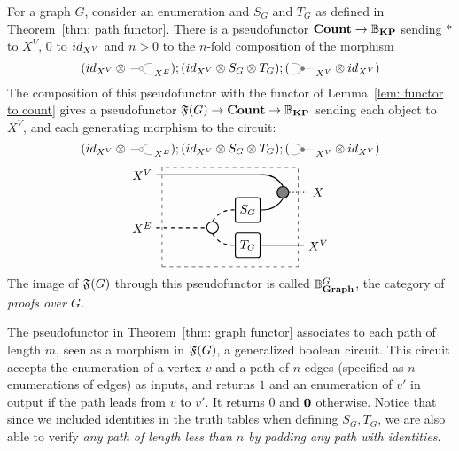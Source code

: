 \documentclass[submission,copyright,creativecommons,sharealike,noncommercial]{eptcs}
\begin{document}
\begin{theorem}\label{thm: graph functor}
  For a graph $G$, consider an enumeration and $S_G$ and $T_G$ 
  as defined in Theorem~\ref{thm: path functor}. There is a pseudofunctor 
  $\textbf{Count} \to \mathbb{B}_\textbf{KP}$ sending $*$ to $X^V$, $0$ to $id_{X^V}$ 
  and $n > 0$ to the $n$-fold composition of the morphism
  \begin{equation*}
      (\Id{X^V} \Tensor \COPYSym_{X^E});
      (\Id{X^V} \Tensor S_G \Tensor T_G);(\MATCHSym_{X^V} \Tensor \Id{X^V})
  \end{equation*}
  The composition of this pseudofunctor with the functor of 
  Lemma~\ref{lem: functor to count} gives a pseudofunctor 
  $\mathfrak{F}(G) \to \textbf{Count} \to \mathbb{B}_\textbf{KP}$ sending each object to $X^V$, and each 
  generating morphism to the circuit:
  \begin{equation*}
    (\Id{X^V} \Tensor \COPYSym_{X^E});
      (\Id{X^V} \Tensor S_G \Tensor T_G);(\MATCHSym_{X^V} \Tensor \Id{X^V})
  \end{equation*}
  \begin{equation*}
    \begin{tikzpicture}
      \node[draw, circle, radius=5pt, thick] (copy) at (-1,0.5) {};
      \node[draw, minimum height=20, minimum width=20, rounded corners=2, thick] (S) at (0,1) {$S_G$};
      \node[draw, minimum height=20, minimum width=20, rounded corners=2, thick] (T) at (0,0) {$T_G$};
      \node[draw, fill=gray, circle, radius=5pt, thick] (mat) at (1,1.5) {};

      \node[draw, dashed, minimum height=80, minimum width=110] (contour) at (-0.5,0.8) {};

      \node (Xv) at (-3,2) {$X^V$};
      \node (Xe) at (-3,0.5) {$X^E$};
      \node (X) at (2,1.5) {$X$};
      \node (Xv2) at (2,0) {$X^V$};

      \draw[-, thick] (Xv) to (10pt,2);
      \draw[bend left, thick] (10pt,2) to (mat.north);
      \draw[bend right, thick] (S.east) to (mat.south);

      \draw[dashed, -, thick] (Xe) to (copy.west);

      \draw[dashed, bend left, thick] (copy.north) to (S.west);
      \draw[dashed, bend right, thick] (copy.south) to (T.west);

      \draw[-, dotted, thick] (mat.east) -- (X);
      \draw[-, thick] (T.east) -- (Xv2.west);
    \end{tikzpicture}
  \end{equation*}
  The image of $\mathfrak{F}(G)$ through this pseudofunctor 
  is called $\mathbb{B}^{G}_{\textbf{Graph}}$, the category of \emph{proofs over $G$.}
\end{theorem}
%
The pseudofunctor in Theorem~\ref{thm: graph functor} 
associates to each path of length $m$, seen as a morphism 
in $\mathfrak{F}(G)$, a generalized boolean circuit. 
This circuit accepts the enumeration of a vertex $v$ 
and a path of $n$ edges (specified as $n$ enumerations 
of edges) as inputs, and returns $1$ and an enumeration of $v'$
in output if the path leads from $v$ to $v'$. It returns $0$ and 
$\textbf{0}$ otherwise. Notice that since we included identities 
in the truth tables when defining $S_G, T_G$, we are also 
able to verify \emph{any path of length less than $n$ by 
padding any path with identities}.
%
%
%
\end{document}
